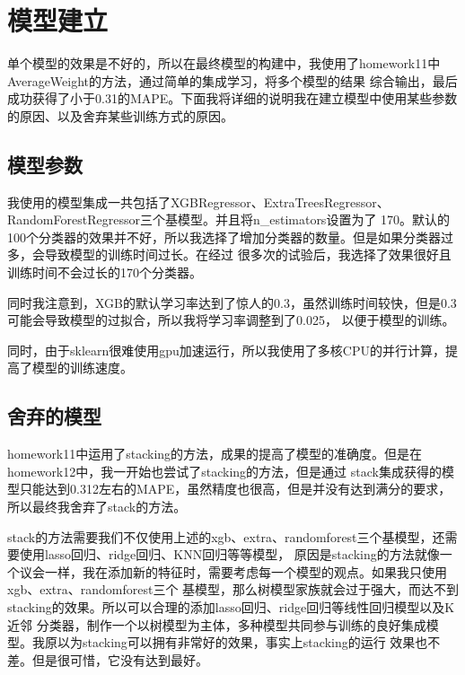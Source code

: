 \documentclass{ctexart}
\begin{document}
\section{模型建立}
单个模型的效果是不好的，所以在最终模型的构建中，我使用了homework11中AverageWeight的方法，通过简单的集成学习，将多个模型的结果
综合输出，最后成功获得了小于0.31的MAPE。下面我将详细的说明我在建立模型中使用某些参数的原因、以及舍弃某些训练方式的原因。
    \subsection{模型参数}
    我使用的模型集成一共包括了XGBRegressor、ExtraTreesRegressor、RandomForestRegressor三个基模型。并且将n\_estimators设置为了
    170。默认的100个分类器的效果并不好，所以我选择了增加分类器的数量。但是如果分类器过多，会导致模型的训练时间过长。在经过
    很多次的试验后，我选择了效果很好且训练时间不会过长的170个分类器。\par
    同时我注意到，XGB的默认学习率达到了惊人的0.3，虽然训练时间较快，但是0.3可能会导致模型的过拟合，所以我将学习率调整到了0.025，
    以便于模型的训练。\par
    同时，由于sklearn很难使用gpu加速运行，所以我使用了多核CPU的并行计算，提高了模型的训练速度。\par

    \subsection{舍弃的模型}
    homework11中运用了stacking的方法，成果的提高了模型的准确度。但是在homework12中，我一开始也尝试了stacking的方法，但是通过
    stack集成获得的模型只能达到0.312左右的MAPE，虽然精度也很高，但是并没有达到满分的要求，所以最终我舍弃了stack的方法。\par
    stack的方法需要我们不仅使用上述的xgb、extra、randomforest三个基模型，还需要使用lasso回归、ridge回归、KNN回归等等模型，
    原因是stacking的方法就像一个议会一样，我在添加新的特征时，需要考虑每一个模型的观点。如果我只使用xgb、extra、randomforest三个
    基模型，那么树模型家族就会过于强大，而达不到stacking的效果。所以可以合理的添加lasso回归、ridge回归等线性回归模型以及K近邻
    分类器，制作一个以树模型为主体，多种模型共同参与训练的良好集成模型。我原以为stacking可以拥有非常好的效果，事实上stacking的运行
    效果也不差。但是很可惜，它没有达到最好。\par
\end{document}
